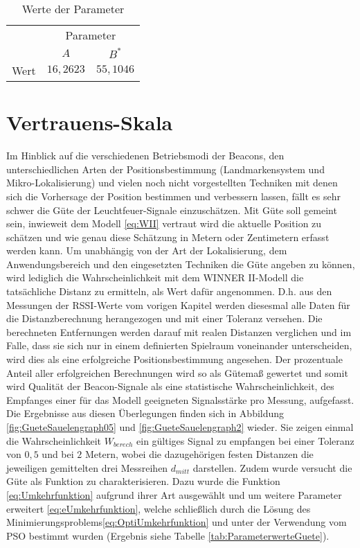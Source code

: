 \begin{table}[H]
\begin{center}
\begin{tabular}{|c|c|c|}
\cline{2-3}
\multicolumn{1}{c|}{} & \multicolumn{2}{c|}{Parameter} \\
\cline{2-3}
\multicolumn{1}{c|}{} & $A$ & $B^{\ast}$ \\
\hline
\multirow{1}{*}{Wert} & $16,2623$ & $55,1046$ \\
\hline
\end{tabular}
\end{center}
\caption{Werte der Parameter}
\label{tab:Parameterwerte}
\end{table} 
\section{Vertrauens-Skala}
Im Hinblick auf die verschiedenen Betriebsmodi der Beacons, den unterschiedlichen Arten der Positionsbestimmung (Landmarkensystem und Mikro-Lokalisierung) und vielen noch nicht vorgestellten Techniken mit denen sich die Vorhersage der Position bestimmen und verbessern lassen, fällt es sehr schwer die Güte der Leuchtfeuer-Signale einzuschätzen. Mit Güte soll gemeint sein, inwieweit dem Modell \ref{eq:WII} vertraut wird die aktuelle Position zu schätzen und wie genau diese Schätzung in Metern oder Zentimetern erfasst werden kann. Um unabhängig von der Art der Lokalisierung, dem Anwendungsbereich und den eingesetzten Techniken die Güte angeben zu können, wird lediglich die Wahrscheinlichkeit mit dem WINNER II-Modell die tatsächliche Distanz zu ermitteln, als Wert dafür angenommen. D.h. aus den Messungen der RSSI-Werte vom vorigen Kapitel werden diesesmal alle Daten für die Distanzberechnung herangezogen und mit einer Toleranz versehen. Die berechneten Entfernungen werden darauf mit realen Distanzen verglichen und im Falle, dass sie sich nur in einem definierten Spielraum voneinander unterscheiden, wird dies als eine erfolgreiche Positionsbestimmung angesehen. Der prozentuale Anteil aller erfolgreichen Berechnungen wird so als Gütemaß gewertet und somit wird Qualität der Beacon-Signale als eine statistische Wahrscheinlichkeit, des Empfanges einer für das Modell geeigneten Signalsstärke pro Messung, aufgefasst. Die Ergebnisse aus diesen Überlegungen finden sich in Abbildung \ref{fig:GueteSauelengraph05} und \ref{fig:GueteSauelengraph2} wieder. Sie zeigen einmal die Wahrscheinlichkeit $W_{berech}$ ein gültiges Signal zu empfangen bei einer Toleranz von $0,5$ und bei $2$ Metern, wobei die dazugehörigen festen Distanzen die jeweiligen gemittelten drei Messreihen $d_{mitt}$ darstellen. Zudem wurde versucht die Güte als Funktion zu charakterisieren. Dazu wurde die Funktion \ref{eq:Umkehrfunktion} aufgrund ihrer Art ausgewählt und um weitere Parameter erweitert \ref{eq:eUmkehrfunktion}, welche schließlich durch die Lösung des Minimierungsproblems\ref{eq:OptiUmkehrfunktion} und unter der Verwendung vom PSO bestimmt wurden (Ergebnis siehe Tabelle \ref{tab:ParameterwerteGuete}).
